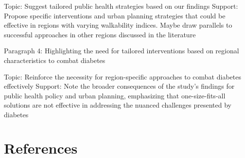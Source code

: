 \documentclass[
]{article}
\begin{document}
Topic: Suggest tailored public health strategies based on our findings
Support: Propose specific interventions and urban planning strategies
that could be effective in regions with varying walkability indices.
Maybe draw parallels to successful approaches in other regions discussed
in the literature

Paragraph 4: Highlighting the need for tailored interventions based on
regional characteristics to combat diabetes

Topic: Reinforce the necessity for region-specific approaches to combat
diabetes effectively Support: Note the broader consequences of the
study's findings for public health policy and urban planning,
emphasizing that one-size-fits-all solutions are not effective in
addressing the nuanced challenges presented by diabetes

\newpage{}

\section*{References}\label{references}
\end{document}
